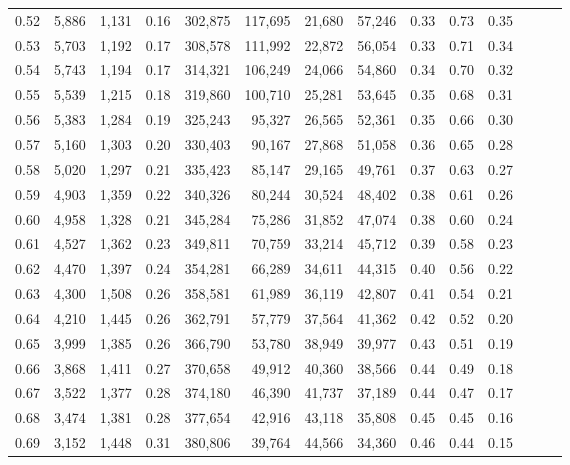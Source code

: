 \begin{tabular}{rrrrrrrrrrrrrr}
0.52 &   5,886 &  1,131 &  0.16 &  302,875 &  117,695 &  21,680 &  57,246 &  0.33 &  0.73 &      0.35 \\
0.53 &   5,703 &  1,192 &  0.17 &  308,578 &  111,992 &  22,872 &  56,054 &  0.33 &  0.71 &      0.34 \\
0.54 &   5,743 &  1,194 &  0.17 &  314,321 &  106,249 &  24,066 &  54,860 &  0.34 &  0.70 &      0.32 \\
0.55 &   5,539 &  1,215 &  0.18 &  319,860 &  100,710 &  25,281 &  53,645 &  0.35 &  0.68 &      0.31 \\
0.56 &   5,383 &  1,284 &  0.19 &  325,243 &   95,327 &  26,565 &  52,361 &  0.35 &  0.66 &      0.30 \\
0.57 &   5,160 &  1,303 &  0.20 &  330,403 &   90,167 &  27,868 &  51,058 &  0.36 &  0.65 &      0.28 \\
0.58 &   5,020 &  1,297 &  0.21 &  335,423 &   85,147 &  29,165 &  49,761 &  0.37 &  0.63 &      0.27 \\
0.59 &   4,903 &  1,359 &  0.22 &  340,326 &   80,244 &  30,524 &  48,402 &  0.38 &  0.61 &      0.26 \\
0.60 &   4,958 &  1,328 &  0.21 &  345,284 &   75,286 &  31,852 &  47,074 &  0.38 &  0.60 &      0.24 \\
0.61 &   4,527 &  1,362 &  0.23 &  349,811 &   70,759 &  33,214 &  45,712 &  0.39 &  0.58 &      0.23 \\
0.62 &   4,470 &  1,397 &  0.24 &  354,281 &   66,289 &  34,611 &  44,315 &  0.40 &  0.56 &      0.22 \\
0.63 &   4,300 &  1,508 &  0.26 &  358,581 &   61,989 &  36,119 &  42,807 &  0.41 &  0.54 &      0.21 \\
0.64 &   4,210 &  1,445 &  0.26 &  362,791 &   57,779 &  37,564 &  41,362 &  0.42 &  0.52 &      0.20 \\
0.65 &   3,999 &  1,385 &  0.26 &  366,790 &   53,780 &  38,949 &  39,977 &  0.43 &  0.51 &      0.19 \\
0.66 &   3,868 &  1,411 &  0.27 &  370,658 &   49,912 &  40,360 &  38,566 &  0.44 &  0.49 &      0.18 \\
0.67 &   3,522 &  1,377 &  0.28 &  374,180 &   46,390 &  41,737 &  37,189 &  0.44 &  0.47 &      0.17 \\
0.68 &   3,474 &  1,381 &  0.28 &  377,654 &   42,916 &  43,118 &  35,808 &  0.45 &  0.45 &      0.16 \\
0.69 &   3,152 &  1,448 &  0.31 &  380,806 &   39,764 &  44,566 &  34,360 &  0.46 &  0.44 &      0.15 \\

\end{tabular}
